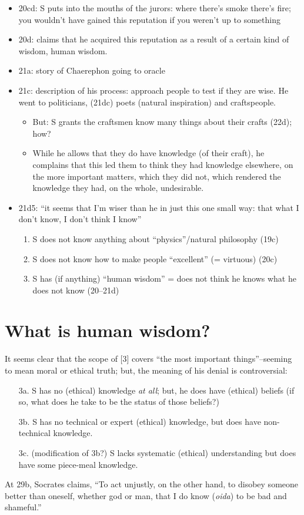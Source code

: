 \documentclass[oneside]{article}
\begin{document}
\begin{itemize}
\item 20cd: S puts into the mouths of the jurors: where there's smoke there's fire; you wouldn't have gained this reputation if you weren't up to something
\item 20d: claims that he acquired this reputation as a result of a certain kind of wisdom, human wisdom.
\item	21a: story of Chaerephon going to oracle
\item	21c: description of his process: approach people to test if they are wise. He went to politicians, (21dc) poets (natural inspiration) and craftspeople.
\begin{itemize} \item  But: S grants the craftsmen know many things about their crafts (22d); how? 
\item While he allows that they do have knowledge (of their craft), he complains that this led them to think they had knowledge elsewhere, on the more important matters, which they did not, which rendered the knowledge they had, on the whole, undesirable.
\end{itemize}

\item  21d5: ``it seems that I’m wiser than he in just this one small way: that what I don’t know, I don’t think I know''
\begin{enumerate}
\item S does not know anything about ``physics''/natural philosophy (19c)
\item S does not know how to make people ``excellent'' (= virtuous) (20c)
\item S has (if anything) ``human wisdom'' = does not think he knows what he does not know (20--21d)


\end{enumerate}
\end{itemize}
\section*{What is human wisdom?}

It seems clear that the scope of [3] covers ``the most important things''--seeming to mean moral or ethical truth; but, the meaning of his denial is controversial:

\begin{enumerate}\item[3a.] S has no (ethical) knowledge \emph{at all}; but, he does have (ethical) beliefs (if so, what does he take to be the status of those beliefs?)

\item[3b.] S has no technical or expert (ethical) knowledge, but does have non-technical knowledge.
\item[3c.] (modification of 3b?) S lacks systematic (ethical) understanding but does have some piece-meal knowledge.
\end{enumerate}
\noindent At 29b, Socrates claims, ``To act unjustly, on the other hand, to disobey someone better than oneself, whether god or man, that I do know (\emph{oida}) to be bad and shameful.''
\end{document}
